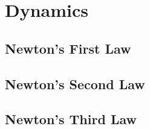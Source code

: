 \section{Dynamics}

\subsection{Newton's First Law}

\subsection{Newton's Second Law}

\subsection{Newton's Third Law}
